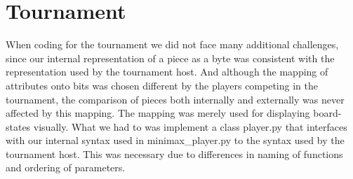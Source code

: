 \section{Tournament}\label{tournament}
When coding for the tournament we did not face many additional challenges, 
since our internal representation of a \quarto{} piece as a byte was 
consistent with the representation used by the tournament host. And although 
the mapping of attributes onto bits was chosen different by the players 
competing in the tournament, the comparison of pieces both internally and 
externally was never affected by this mapping. The mapping was merely used for 
displaying board-states visually.
What we had to was implement a class player.py that interfaces with our 
internal syntax used in minimax\_player.py to the syntax used by the 
tournament host. This was necessary due to differences in naming of functions 
and ordering of parameters.